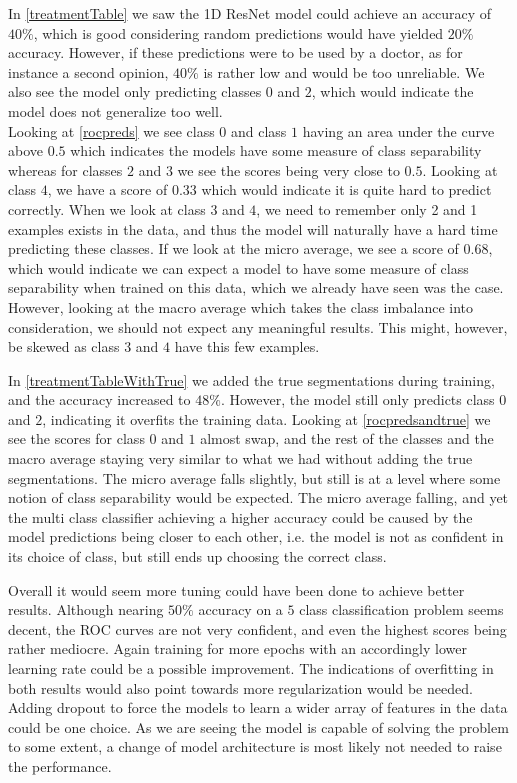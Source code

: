 In \autoref{treatmentTable} we saw the 1D ResNet model could achieve an accuracy of $40\%$, which is good considering random predictions would have yielded $20\%$ accuracy. However, if these predictions were to be used by a doctor, as for instance a second opinion, $40\%$ is rather low and would be too unreliable. We also see the model only predicting classes $0$ and $2$, which would indicate the model does not generalize too well.\\
Looking at \autoref{rocpreds} we see class $0$ and class $1$ having an area under the curve above $0.5$ which indicates the models have some measure of class separability whereas for classes $2$ and $3$ we see the scores being very close to $0.5$. Looking at class $4$, we have a score of $0.33$ which would indicate it is quite hard to predict correctly. When we look at class $3$ and $4$, we need to remember only 2 and 1 examples exists in the data, and thus the model will naturally have a hard time predicting these classes. If we look at the micro average, we see a score of $0.68$, which would indicate we can expect a model to have some measure of class separability when trained on this data, which we already have seen was the case. However, looking at the macro average which takes the class imbalance into consideration, we should not expect any meaningful results. This might, however, be skewed as class $3$ and $4$ have this few examples.

In \autoref{treatmentTableWithTrue} we added the true segmentations during training, and the accuracy increased to $48\%$. However, the model still only predicts class $0$ and $2$, indicating it overfits the training data. Looking at \autoref{rocpredsandtrue} we see the scores for class $0$ and $1$ almost swap, and the rest of the classes and the macro average staying very similar to what we had without adding the true segmentations. The micro average falls slightly, but still is at a level where some notion of class separability would be expected. The micro average falling, and yet the multi class classifier achieving a higher accuracy could be caused by the model predictions being closer to each other, i.e. the model is not as confident in its choice of class, but still ends up choosing the correct class.

Overall it would seem more tuning could have been done to achieve better results. Although nearing $50\%$ accuracy on a $5$ class classification problem seems decent, the ROC curves are not very confident, and even the highest scores being rather mediocre. Again training for more epochs with an accordingly lower learning rate could be a possible improvement. The indications of overfitting in both results would also point towards more regularization would be needed. Adding dropout to force the models to learn a wider array of features in the data could be one choice. As we are seeing the model is capable of solving the problem to some extent, a change of model architecture is most likely not needed to raise the performance.

